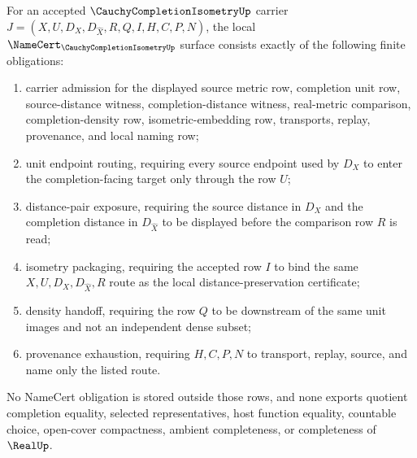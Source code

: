 \begin{theorem}
\label{thm:cauchy-completion-isometry-namecert-obligations}
For an accepted $\CauchyCompletionIsometryUp$ carrier $J=(X,U,D_X,D_{\widehat X},R,Q,I,H,C,P,N)$, the local $\NameCert_{\CauchyCompletionIsometryUp}$ surface consists exactly of the following finite obligations:
\begin{enumerate}
\item carrier admission for the displayed source metric row, completion unit row, source-distance witness, completion-distance witness, real-metric comparison, completion-density row, isometric-embedding row, transports, replay, provenance, and local naming row;
\item unit endpoint routing, requiring every source endpoint used by $D_X$ to enter the completion-facing target only through the row $U$;
\item distance-pair exposure, requiring the source distance in $D_X$ and the completion distance in $D_{\widehat X}$ to be displayed before the comparison row $R$ is read;
\item isometry packaging, requiring the accepted row $I$ to bind the same $X,U,D_X,D_{\widehat X},R$ route as the local distance-preservation certificate;
\item density handoff, requiring the row $Q$ to be downstream of the same unit images and not an independent dense subset;
\item provenance exhaustion, requiring $H,C,P,N$ to transport, replay, source, and name only the listed route.
\end{enumerate}
No NameCert obligation is stored outside those rows, and none exports quotient completion equality, selected representatives, host function equality, countable choice, open-cover compactness, ambient completeness, or completeness of $\RealUp$.
\end{theorem}
